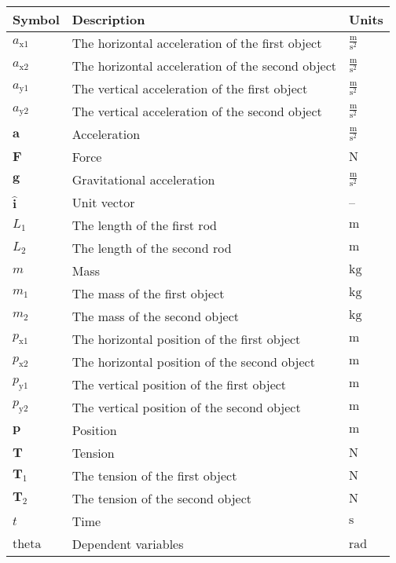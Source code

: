 \documentclass[12pt]{article}
\begin{document}
\begin{longtable}{l l l}
\toprule
\textbf{Symbol} & \textbf{Description} & \textbf{Units}
\\
\midrule
\endhead
${a_{\text{x}1}}$ & The horizontal acceleration of the first object & $\frac{\text{m}}{\text{s}^{2}}$
\\
${a_{\text{x}2}}$ & The horizontal acceleration of the second object & $\frac{\text{m}}{\text{s}^{2}}$
\\
${a_{\text{y}1}}$ & The vertical acceleration of the first object & $\frac{\text{m}}{\text{s}^{2}}$
\\
${a_{\text{y}2}}$ & The vertical acceleration of the second object & $\frac{\text{m}}{\text{s}^{2}}$
\\
$\symbf{a}$ & Acceleration & $\frac{\text{m}}{\text{s}^{2}}$
\\
$\symbf{F}$ & Force & ${\text{N}}$
\\
$\symbf{g}$ & Gravitational acceleration & $\frac{\text{m}}{\text{s}^{2}}$
\\
$\symbf{\hat{i}}$ & Unit vector & --
\\
${L_{1}}$ & The length of the first rod & ${\text{m}}$
\\
${L_{2}}$ & The length of the second rod & ${\text{m}}$
\\
$m$ & Mass & ${\text{kg}}$
\\
${m_{1}}$ & The mass of the first object & ${\text{kg}}$
\\
${m_{2}}$ & The mass of the second object & ${\text{kg}}$
\\
${p_{\text{x}1}}$ & The horizontal position of the first object & ${\text{m}}$
\\
${p_{\text{x}2}}$ & The horizontal position of the second object & ${\text{m}}$
\\
${p_{\text{y}1}}$ & The vertical position of the first object & ${\text{m}}$
\\
${p_{\text{y}2}}$ & The vertical position of the second object & ${\text{m}}$
\\
$\symbf{p}$ & Position & ${\text{m}}$
\\
$\symbf{T}$ & Tension & ${\text{N}}$
\\
${\symbf{T}_{1}}$ & The tension of the first object & ${\text{N}}$
\\
${\symbf{T}_{2}}$ & The tension of the second object & ${\text{N}}$
\\
$t$ & Time & ${\text{s}}$
\\
$\text{theta}$ & Dependent variables & ${\text{rad}}$

\end{longtable}
\end{document}
